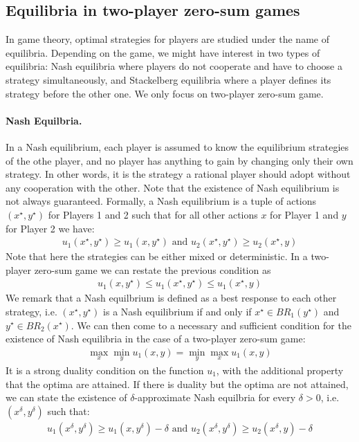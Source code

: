 \subsection{Equilibria in two-player zero-sum games}



In game theory, optimal strategies for players are studied under the name of equilibria. Depending on the game, we might have interest in two types of equilibria: Nash equilibria where players do not cooperate and have to choose a strategy simultaneously, and Stackelberg equilibria where a player defines its strategy before the other one. We only focus on two-player zero-sum game.

\paragraph{Nash Equilbria.} In a Nash equilibrium, each player is assumed to know the equilibrium strategies of the othe player, and no player has anything to gain by changing only their own strategy. In other words, it is the strategy a rational player should adopt without any cooperation with the other. Note that the existence of Nash equilibrium is not always guaranteed. Formally, a Nash equilibrium is a tuple of actions $(x^\star,y^\star)$ for Players 1 and 2 such that for all other actions $x$ for Player 1 and $y$ for Player 2 we have:
\begin{align*}
    u_1(x^\star,y^\star)\geq u_1(x,y^\star)\text{ and } u_2(x^\star,y^\star)\geq u_2(x^\star,y)
\end{align*}
Note that here the strategies can be either mixed or deterministic. In a two-player zero-sum game we can restate the previous condition as 
\begin{align*}
    u_1(x,y^\star)\leq u_1(x^\star,y^\star)\leq u_1(x^\star,y)
\end{align*}
We remark that a Nash equilbrium is defined as a best response to each other strategy, i.e. $(x^\star,y^\star)$ is a Nash equilibrium if and only if $x^\star\in BR_1(y^\star)$ and $y^\star\in BR_2(x^\star)$. We can then come to a necessary and sufficient condition for the existence of Nash equilibria in the case of a two-player zero-sum game:
\begin{align*}
    \max_x\min_y u_1(x,y) = \min_y\max_x u_1(x,y)
\end{align*}
It is a strong duality condition on the function $u_1$, with the additional property that the optima are  attained. If there is duality but the optima are not attained, we can state the existence of $\delta$-approximate Nash equilbria for every $\delta>0$, i.e. $(x^\delta,y^\delta)$ such that:
\begin{align*}
    u_1(x^\delta,y^\delta)\geq u_1(x,y^\delta)-\delta\text{ and } u_2(x^\delta,y^\delta)\geq u_2(x^\delta,y)-\delta
\end{align*}


